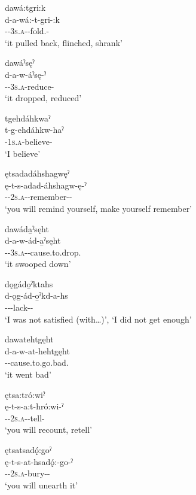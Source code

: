 \ex dawá:tgri:k\\
\gll d-a-wá:-t-gri-:k\\
{\cislocative}-{\factual}-\textsc{3s.a}-{\semireflexive}-fold.{\zeropunctual}-{\modalizer}\\
\glt `it pulled back, flinched, shrank'

\ex dawáˀsęˀ\\
\gll d-a-w-áˀsę-ˀ\\
{\cislocative}-{\factual}-\textsc{3s.a}-reduce-{\punctual}\\
\glt `it dropped, reduced'

\ex tgehdáhkwaˀ\\
\gll t-g-ehdáhkw-haˀ\\
{\cislocative}-\textsc{1s.a}-believe-{\habitual}\\
\glt `I believe'

\ex ętsadadáhshagwęˀ\\
\gll ę-t-s-adad-áhshagw-ę-ˀ\\
\fut-{\cislocative}-\textsc{2s.a}-{}-remember-{\benefactive}-{\punctual}\\
\glt `you will remind yourself, make yourself remember'

\ex dawáda̱ˀsęht\\
\gll d-a-w-ád-a̱ˀsęht\\
{\cislocative}-{\factual}-\textsc{3s.a}-{\semireflexive}-cause.to.\-drop.{\zeropunctual}\\
\glt `it swooped down'

\ex dǫgádo̱ˀktahs \\
\gll d-ǫg-ád-o̱ˀkd-a-hs\\
{\cislocative}--{\semireflexive}-lack-{\joinerA}-{\habitual}\\
\glt ‘I was not satisfied (with…)’, `I did not get enough'

\ex dawatehtgęht\\
\gll d-a-w-at-hehtgęht\\
{\cislocative}-{\factual}-cause.to.\-go.bad.{\zeropunctual}\\
\glt `it went bad'

\ex ętsa:tró:wiˀ\\
\gll ę-t-s-a:t-hró:wi-ˀ\\
\fut-{\cislocative}-\textsc{2s.a}-{\semireflexive}-tell-{\punctual}\\
\glt `you will recount, retell'

\ex ętsatsadǫ́:goˀ\\
\gll ę-t-s-at-hsadǫ́:-go-ˀ\\
\fut-{\cislocative}-\textsc{2s.a}-bury-{\reversive}-{\punctual}\\
\glt `you will unearth it'

